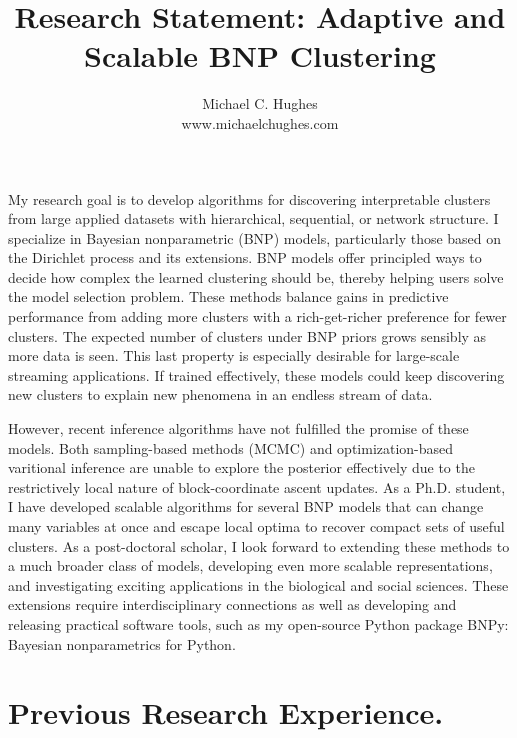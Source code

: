 \documentclass[11pt,letterpaper,sans]{article}
\title{Research Statement: Adaptive and Scalable BNP Clustering}
\author{Michael C. Hughes \\ www.michaelchughes.com}
\begin{document}
\maketitle

My research goal is to develop algorithms for discovering interpretable clusters from large applied datasets with hierarchical, sequential, or network structure. 
I specialize in Bayesian nonparametric (BNP) models, particularly those based on the Dirichlet process and its extensions. BNP models offer principled ways to decide how complex the learned clustering should be, thereby helping users solve the model selection problem. These methods balance gains in predictive performance from adding more clusters with a rich-get-richer preference for fewer clusters.
The expected number of clusters under BNP priors grows sensibly as more data is seen. This last property is especially desirable for large-scale streaming applications. If trained effectively, these models could keep discovering new clusters to explain new phenomena in an endless stream of data.

However, recent inference algorithms have not fulfilled the promise of these models. Both sampling-based methods (MCMC) and optimization-based varitional inference are unable to explore the posterior effectively due to the restrictively local nature of block-coordinate ascent updates. As a Ph.D. student, I have developed scalable algorithms for several BNP models that can change many variables at once and escape local optima to recover compact sets of useful clusters. As a post-doctoral scholar, I look forward to extending these methods to a much broader class of models, developing even more scalable representations, and investigating exciting applications in the biological and social sciences. These extensions require interdisciplinary connections as well as developing and releasing practical software tools, such as my open-source Python package BNPy: Bayesian nonparametrics for Python.

\section{Previous Research Experience.}
\end{document}
